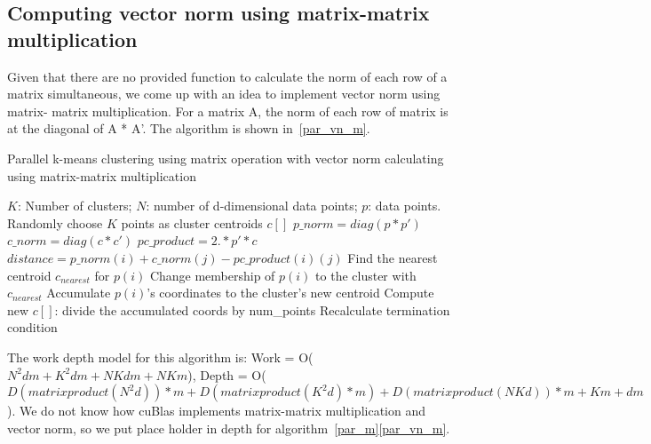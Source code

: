 \subsection{Computing vector norm using matrix-matrix multiplication}
Given that there are no provided function to calculate the
norm of each row of a matrix simultaneous, we come up with an idea to implement vector norm using matrix-
matrix multiplication. For a matrix A, the norm of each row of matrix is at the diagonal of A * A'. The
algorithm is shown in~\ref{par_vn_m}. 
\begin{algorithm}[!htp]
  \caption{Parallel k-means clustering using matrix operation with vector norm calculating using
    matrix-matrix multiplication} \label{par_vn_m}
  \begin{algorithmic}[1]
    \INPUT $K$: Number of clusters; $N$: number of d-dimensional data points; $p$: data points.
     \label{alg:pm2}
    \State Randomly choose $K$ points as cluster centroids $c[]$
    \State $p\_norm = diag(p * p')$
    \State $c\_norm = diag(c * c')$
    \State $pc\_product = 2 .* p' * c$
    \State $distance = p\_norm(i) + c\_norm(j) - pc\_product(i)(j)$
    \EndFor
    \State Find the nearest centroid $c_{nearest}$ for $p(i)$
    \State Change membership of $p(i)$ to the cluster with $c_{nearest}$
    \State Accumulate $p(i)$'s coordinates to the cluster's new centroid
    \EndParFor
    \State Compute new $c[]$: divide the accumulated coords by num\_points
    \State Recalculate termination condition
    \EndWhile
    \EndFunction
  \end{algorithmic}
\end{algorithm}
The work depth model for this algorithm is: Work = O($N^2dm + K^2dm + NKdm + NKm$),
Depth = O($D(matrix product(N^2d))*m + D(matrix product(K^2d)*m) + D(matrix product(NKd))*m+ Km + dm$).
We do not know how cuBlas implements matrix-matrix multiplication and vector norm, so we put place holder
in depth for algorithm~\ref{par_m}\ref{par_vn_m}. 
